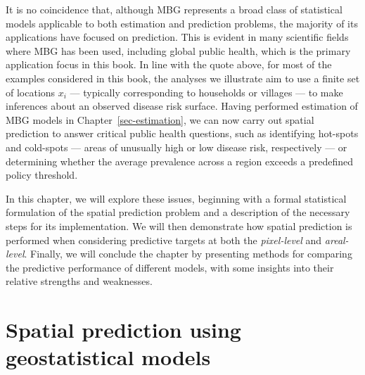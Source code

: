 \documentclass[
  letterpaper,
]{krantz}
\begin{document}
It is no coincidence that, although MBG represents a broad class of
statistical models applicable to both estimation and prediction
problems, the majority of its applications have focused on prediction.
This is evident in many scientific fields where MBG has been used,
including global public health, which is the primary application focus
in this book. In line with the quote above, for most of the examples
considered in this book, the analyses we illustrate aim to use a finite
set of locations \(x_i\) --- typically corresponding to households or
villages --- to make inferences about an observed disease risk surface.
Having performed estimation of MBG models in
Chapter~\ref{sec-estimation}, we can now carry out spatial prediction to
answer critical public health questions, such as identifying hot-spots
and cold-spots --- areas of unusually high or low disease risk,
respectively --- or determining whether the average prevalence across a
region exceeds a predefined policy threshold.

In this chapter, we will explore these issues, beginning with a formal
statistical formulation of the spatial prediction problem and a
description of the necessary steps for its implementation. We will then
demonstrate how spatial prediction is performed when considering
predictive targets at both the \emph{pixel-level} and
\emph{areal-level}. Finally, we will conclude the chapter by presenting
methods for comparing the predictive performance of different models,
with some insights into their relative strengths and weaknesses.

\section{Spatial prediction using geostatistical
models}\label{sec-spat-pred-target}
\end{document}
